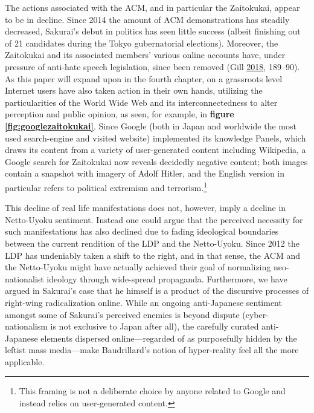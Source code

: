 \documentclass[10pt,british,A4paper,twoside]{memoir}
\begin{document}
The actions associated with the ACM, and in particular the Zaitokukai,
appear to be in decline. Since 2014 the amount of ACM demonstrations has
steadily decreased, Sakurai's debut in politics has seen little success
(albeit finishing  out of 21 candidates during the Tokyo
gubernatorial elections). Moreover, the Zaitokukai and its associated
members' various online accounts have, under pressure of anti-hate
speech legislation, since been removed (Gill
\protect\hyperlink{ref-gill_nativist_2018}{2018}, 189--90). As this
paper will expand upon in the fourth chapter, on a grassroots level
Internet users have also taken action in their own hands, utilizing the
particularities of the World Wide Web and its interconnectedness to
alter perception and public opinion, as seen, for example, in
\textbf{figure \ref{fig:googlezaitokukai}}. Since Google (both in Japan
and worldwide the most used search-engine and visited website)
implemented its knowledge Panels, which draws its content from a variety
of user-generated content including Wikipedia, a Google search for
Zaitokukai now reveals decidedly negative content; both images contain a
snapshot with imagery of Adolf Hitler, and the English version in
particular refers to political extremism and terrorism.\footnote{This
  framing is not a deliberate choice by anyone related to Google and
  instead relies on user-generated content.}

This decline of real life manifestations does not, however, imply a
decline in Netto-Uyoku sentiment. Instead one could argue that the
perceived necessity for such manifestations has also declined due to
fading ideological boundaries between the current rendition of the LDP
and the Netto-Uyoku. Since 2012 the LDP has undeniably taken a shift to
the right, and in that sense, the ACM and the Netto-Uyoku might have
actually achieved their goal of normalizing neo-nationalist ideology
through wide-spread propaganda. Furthermore, we have argued in Sakurai's
case that he himself is a product of the discursive processes of
right-wing radicalization online. While an ongoing anti-Japanese
sentiment amongst some of Sakurai's perceived enemies is beyond dispute
(cyber-nationalism is not exclusive to Japan after all), the carefully
curated anti-Japanese elements dispersed online---regarded of as
purposefully hidden by the leftist mass media---make Baudrillard's
notion of hyper-reality feel all the more applicable.
\end{document}
